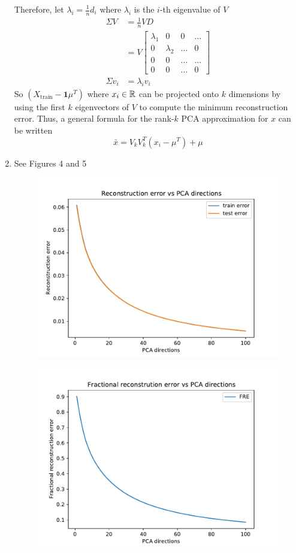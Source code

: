 \begin{enumerate}
	Therefore, let $\lambda_i = \frac{1}{n} d_i$ where $\lambda_i$ is the $i$-th eigenvalue of $V$
	    \begin{align*}
		\Sigma V &= \frac{1}{n} V D \\
			&= V
			\begin{bmatrix}
			    \lambda_1 & 0 & 0 & ... \\
			    0 & \lambda_2 & ... & 0 \\
			    0 & 0 & ... & ... \\
			    0 & 0 & ... & 0
			\end{bmatrix} \\
		\Sigma v_i &= \lambda_i v_i
	    \end{align*}
	So $\left( X_{\textrm{train}} - \mathbf{1} \mu^T \right)$ where $x_i \in \mathbb{R}$ can be projected onto $k$ dimensions by using the first $k$ eigenvectors of $V$ to compute the minimum reconstruction error. 
	Thus, a general formula for the rank-$k$ PCA approximation for $x$ can be written $$ \bar{x} = V_k V_k^T \left(x_i - \mu^T \right) + \mu $$
    \item See Figures 4 and 5
	\begin{figure}[h!]
	    \centering
	    \includegraphics[width=0.8\linewidth]{../figures/a4_re.pdf}
	    \caption{}
	\end{figure}
	\begin{figure}[h!]
	    \centering
	    \includegraphics[width=0.8\linewidth]{../figures/a4_fre.pdf}

\end{figure}
\end{enumerate}
